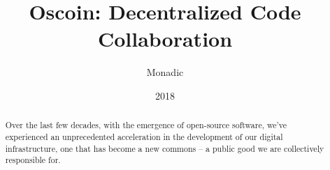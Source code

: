 \documentclass[a4paper, 9pt, draft]{amsart}
\title[Oscoin]{Oscoin: Decentralized Code Collaboration}
\author{Monadic}
\date{2018}
\begin{document}
\begin{abstract}
    Over the last few decades, with the emergence of open-source software,
    we've experienced an unprecedented acceleration in the development of our
    digital infrastructure, one that has become a new commons -- a public good
    we are collectively responsible for.
\end{abstract}
\maketitle

\setlength{\columnsep}{20pt}
\begin{multicols}{2}






\end{multicols}

\appendix
\end{document}
